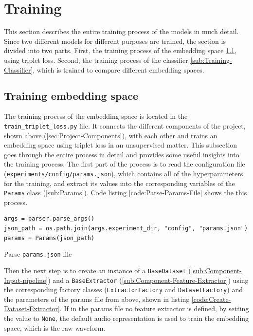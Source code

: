 \section{Training}
\label{sec:Training}
This section describes the entire training process of the models in much detail. Since two different models for different purposes are trained, the section is divided into two parts. First, the training process of the embedding space \ref{sub:Training-Embedding-Space}, using triplet loss. Second, the training process of the classifier \ref{sub:Training-Classifier}, which is trained to compare different embedding spaces.

\subsection{Training embedding space}
\label{sub:Training-Embedding-Space}
The training process of the embedding space is located in the \texttt{train\_triplet\_loss.py} file. It connects the different components of the project, shown above (\ref{sec:Project-Components}), with each other and trains an embedding space using triplet loss in an unsupervised matter. This subsection goes through the entire process in detail and provides some useful insights into the training process.
\newline
\newline
The first part of the process is to read the configuration file (\texttt{experiments/config/params.json}), which contains all of the hyperparameters for the training, and extract its values into the corresponding variables of the \texttt{Params} class (\ref{sub:Params}). Code listing \ref{code:Parse-Params-File} shows the this process.

\begin{code}[H]
\begin{verbatim}
args = parser.parse_args()
json_path = os.path.join(args.experiment_dir, "config", "params.json")
params = Params(json_path)
\end{verbatim}
\caption{Parse \texttt{params.json} file}
\label{code:Parse-Params-File}
\end{code}
\noindent
Then the next step is to create an instance of a \texttt{BaseDataset} (\ref{sub:Component-Input-pipeline}) and a \texttt{BaseExtractor} (\ref{sub:Component-Feature-Extractor}) using the corresponding factory classes (\texttt{ExtractorFactory} and \texttt{DatasetFactory}) and the parameters of the params file from above, shown in listing \ref{code:Create-Dataset-Extractor}. If in the params file no feature extractor is defined, by setting the value to \texttt{None}, the default audio representation is used to train the embedding space, which is the raw waveform.

